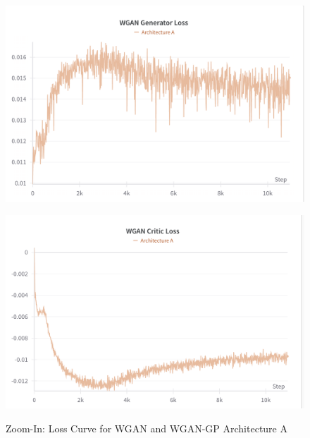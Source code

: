 \documentclass{article}
\begin{document}
\begin{figure}[ht]
    \centering
    \caption{Zoom-In: Loss Curve for WGAN and WGAN-GP Architecture A}
    \begin{minipage}[b]{0.45\textwidth}
        \centering
        \includegraphics[width=\textwidth]{../src/wgan_zoom_in_gen.png}
        \label{fig:image1}
    \end{minipage}
    \hfill
    \begin{minipage}[b]{0.45\textwidth}
        \centering
        \includegraphics[width=\textwidth]{../src/wgan_zoom_in_crit.png}
        \label{fig:image2}
    \end{minipage}
    \begin{minipage}[b]{0.45\textwidth}
        \centering

\end{minipage}
\end{figure}
\end{document}
